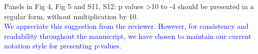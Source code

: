 Panels in Fig 4, Fig 5 and S11, S12: p values >10 to -4 should be presented in a regular form, without multiplication by 10.\\
\textcolor{blue}{We appreciate this suggestion from the reviewer. However, for consistency and readability throughout the manuscript, we have chosen to maintain our current notation style for presenting p-values.}
